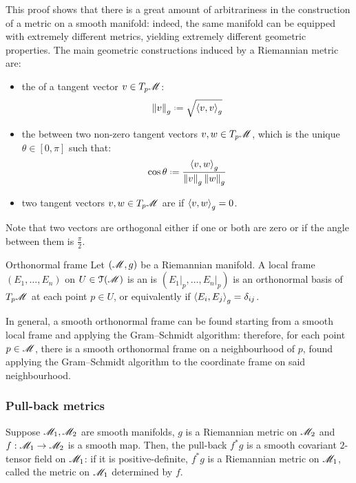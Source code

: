 This proof shows that there is a great amount of arbitrariness in the construction of a metric on a smooth manifold: indeed, the same manifold can be equipped with extremely different metrics, yielding extremely different geometric properties. The main geometric constructions induced by a Riemannian metric are:
\begin{itemize}
  \item the  of a tangent vector $ v \in T_p\mathscr{M} $:
    \begin{equation}
      \norm{v}_g \defeq \sqrt{\braket{v,v}_g}
    \end{equation}
  \item the  between two non-zero tangent vectors $ v,w \in T_p\mathscr{M} $, which is the unique $ \theta \in [0,\pi] $ such that:
    \begin{equation}
      \cos \theta \defeq \frac{\braket{v,w}_g}{\norm{v}_g \norm{w}_g}
    \end{equation}
  \item two tangent vectors $ v,w \in T_p\mathscr{M} $ are  if $ \braket{v,w}_g = 0 $.
\end{itemize}

Note that two vectors are orthogonal either if one or both are zero or if the angle between them is $ \frac{\pi}{2} $.

\begin{definition}{Orthonormal frame}{}
  Let $ (\mathscr{M},g) $ be a Riemannian manifold. A local frame $ (E_1 , \dots , E_n) $ on $ U \in \EuScript{T}(\mathscr{M}) $ is an  is $ (E_1\vert_p , \dots , E_n\vert_p) $ is an orthonormal basis of $ T_p\mathscr{M} $ at each point $ p \in U $, or equivalently if $ \braket{E_i , E_j}_g = \delta_{ij} $.
\end{definition}

In general, a smooth orthonormal frame can be found starting from a smooth local frame and applying the Gram--Schmidt algorithm: therefore, for each point $ p \in \mathscr{M} $, there is a smooth orthonormal frame on a neighbourhood of $ p $, found applying the Gram--Schmidt algorithm to the coordinate frame on said neighbourhood.

\subsubsection{Pull-back metrics}

Suppose $ \mathscr{M}_1 , \mathscr{M}_2 $ are smooth manifolds, $ g $ is a Riemannian metric on $ \mathscr{M}_2 $ and $ f : \mathscr{M}_1 \rightarrow \mathscr{M}_2 $ is a smooth map. Then, the pull-back $ f^*g $ is a smooth covariant $ 2 $-tensor field on $ \mathscr{M}_1 $: if it is positive-definite, $ f^*g $ is a Riemannian metric on $ \mathscr{M}_1 $, called the  metric on $ \mathscr{M}_1 $ determined by $ f $.

